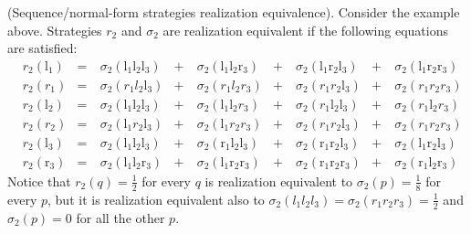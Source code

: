 (Sequence/normal-form strategies realization equivalence). Consider the example above. Strategies $r_2$ and $\sigma_2$ are realization equivalent if the following equations are satisfied:
$$
\begin{aligned}
&r_{2}\left(\mathrm{l}_{1}\right) & = \ & \sigma_{2}\left(\mathrm{l}_{1} \mathrm{l}_{2} \mathrm{l}_{3}\right) & + \ &  \sigma_{2}\left(\mathrm{l}_{1} \mathrm{l}_{2} \mathrm{r}_{3}\right) & + \ &  \sigma_{2}\left(\mathrm{l}_{1} \mathrm{r}_{2}\mathrm{l}_{3}\right) & + \ &  \sigma_{2}\left(\mathrm{l}_{1} \mathrm{r}_{2} \mathrm{r}_{3}\right)\\
&r_{2}\left(r_{1}\right) & = \ & \sigma_{2}\left(r_{1} l_{2}\mathrm{l}_{3}\right) & + \ &  \sigma_{2}\left(r_{1} l_{2} r_{3}\right) & + \ &  \sigma_{2}\left(r_{1} r_{2}\mathrm{l}_{3}\right) & + \ &  \sigma_{2}\left(r_{1} r_{2} r_{3}\right)\\
&r_{2}\left(\mathrm{l}_{2}\right) & = \ & \sigma_{2}\left(\mathrm{l}_{1}\mathrm{l}_{2}\mathrm{l}_{3}\right) & + \ & \sigma_{2}\left(\mathrm{l}_{1}\mathrm{l}_{2} r_{3}\right) & + \ &  \sigma_{2}\left(r_{1}\mathrm{l}_{2}\mathrm{l}_{3}\right) & + \ &  \sigma_{2}\left(r_{1}\mathrm{l}_{2} r_{3}\right)\\
&r_{2}\left(r_{2}\right) & = \ & \sigma_{2}\left(\mathrm{l}_{1} r_{2}\mathrm{l}_{3}\right) & + \ &  \sigma_{2}\left(\mathrm{l}_{1} r_{2} r_{3}\right) & + \ &  \sigma_{2}\left(r_{1} r_{2}\mathrm{l}_{3}\right) & + \ &  \sigma_{2}\left(r_{1} r_{2} r_{3}\right)\\
&r_{2}\left(\mathrm{l}_{3}\right) & = \ & \sigma_{2}\left(\mathrm{l}_{1} \mathrm{l}_{2}\mathrm{l}_{3}\right) & + \ &  \sigma_{2}\left(\mathrm{r}_{1}\mathrm{l}_{2}\mathrm{l}_{3}\right) & + \ &  \sigma_{2}\left(\mathrm{r}_{1} \mathrm{r}_{2}\mathrm{l}_{3}\right) & + \ &  \sigma_{2}\left(\mathrm{l}_{1} \mathrm{r}_{2}\mathrm{l}_{3}\right)\\
&r_{2}\left(\mathrm{r}_{3}\right) & = \ & \sigma_{2}\left(\mathrm{l}_{1} \mathrm{l}_{2} \mathrm{r}_{3}\right) & + \ &  \sigma_{2}\left(\mathrm{l}_{1} \mathrm{r}_{2} \mathrm{r}_{3}\right) & + \ &  \sigma_{2}\left(\mathrm{r}_{1} \mathrm{r}_{2} \mathrm{r}_{3}\right) & + \ &  \sigma_{2}\left(\mathrm{r}_{1}\mathrm{l}_{2} \mathrm{r}_{3}\right)
\end{aligned}
$$
Notice that $ r_{2}(q) = \frac{1}{2} $ for every $q$ is realization equivalent to $ \sigma_{2}(p) = \frac{1}{8} $ for every $p$, but it is realization equivalent also to $ \sigma_{2}(l_{1} l_{2} l_{3}) = \sigma_{2}(r_{1} r_{2} r_{3}) = \frac{1}{2} $ and $ \sigma_{2}(p) = 0 $ for all the other $p$.\\\\
